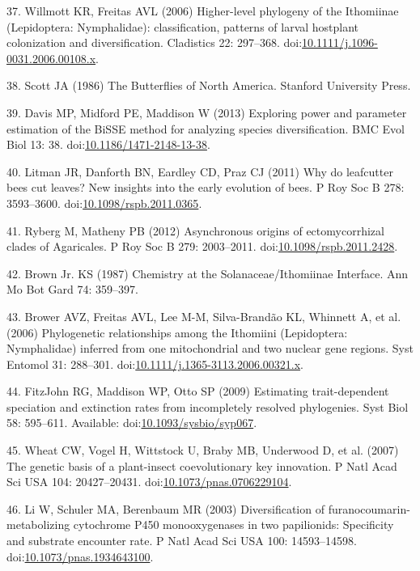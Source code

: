 \documentclass[10pt]{article}
\begin{document}
37. Willmott KR, Freitas AVL (2006) Higher-level phylogeny of the
Ithomiinae (Lepidoptera: Nymphalidae): classification, patterns of
larval hostplant colonization and diversification. Cladistics 22:
297--368.
doi:\href{http://dx.doi.org/10.1111/j.1096-0031.2006.00108.x}{10.1111/j.1096-0031.2006.00108.x}.

38. Scott JA (1986) The Butterflies of North America. Stanford
University Press.

39. Davis MP, Midford PE, Maddison W (2013) Exploring power and
parameter estimation of the BiSSE method for analyzing species
diversification. BMC Evol Biol 13: 38.
doi:\href{http://dx.doi.org/10.1186/1471-2148-13-38}{10.1186/1471-2148-13-38}.

40. Litman JR, Danforth BN, Eardley CD, Praz CJ (2011) Why do leafcutter
bees cut leaves? New insights into the early evolution of bees. P Roy
Soc B 278: 3593--3600.
doi:\href{http://dx.doi.org/10.1098/rspb.2011.0365}{10.1098/rspb.2011.0365}.

41. Ryberg M, Matheny PB (2012) Asynchronous origins of ectomycorrhizal
clades of Agaricales. P Roy Soc B 279: 2003--2011.
doi:\href{http://dx.doi.org/10.1098/rspb.2011.2428}{10.1098/rspb.2011.2428}.

42. Brown Jr. KS (1987) Chemistry at the Solanaceae/Ithomiinae
Interface. Ann Mo Bot Gard 74: 359--397.

43. Brower AVZ, Freitas AVL, Lee M-M, Silva-Brand\~ao KL, Whinnett A, et
al. (2006) Phylogenetic relationships among the Ithomiini (Lepidoptera:
Nymphalidae) inferred from one mitochondrial and two nuclear gene
regions. Syst Entomol 31: 288--301.
doi:\href{http://dx.doi.org/10.1111/j.1365-3113.2006.00321.x}{10.1111/j.1365-3113.2006.00321.x}.

44. FitzJohn RG, Maddison WP, Otto SP (2009) Estimating trait-dependent
speciation and extinction rates from incompletely resolved phylogenies.
Syst Biol 58: 595--611. Available:
doi:\href{http://dx.doi.org/10.1093/sysbio/syp067}{10.1093/sysbio/syp067}.

45. Wheat CW, Vogel H, Wittstock U, Braby MB, Underwood D, et al. (2007)
The genetic basis of a plant-insect coevolutionary key innovation. P
Natl Acad Sci USA 104: 20427--20431.
doi:\href{http://dx.doi.org/10.1073/pnas.0706229104}{10.1073/pnas.0706229104}.

46. Li W, Schuler MA, Berenbaum MR (2003) Diversification of
furanocoumarin-metabolizing cytochrome P450 monooxygenases in two
papilionids: Specificity and substrate encounter rate. P Natl Acad Sci
USA 100: 14593--14598.
doi:\href{http://dx.doi.org/10.1073/pnas.1934643100}{10.1073/pnas.1934643100}.
\end{document}
